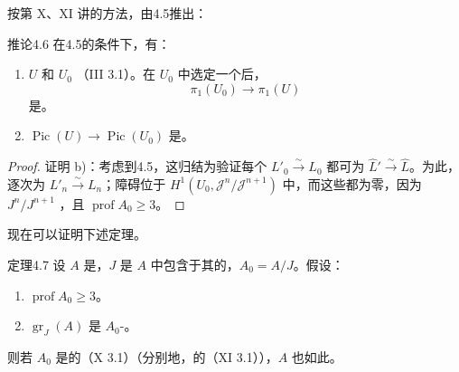 按第 X、XI 讲的方法，由4.5推出：
\begin{SGAresult}{推论}{4.6}
在4.5的条件下，有：
\begin{enumerate}
\item[a)] $U$ 和 $U_0$ （III 3.1）。在 $U_0$ 中选定一个后，
\[
 \pi_1(U_0)\longrightarrow\pi_1(U)
\]
是。
\item[b)]  $\operatorname{Pic}(U)\to\operatorname{Pic}(U_0)$ 是。
\end{enumerate}
\end{SGAresult}
\begin{proof}
证明 b)：考虑到4.5，这归结为验证每个 $L'_0\xrightarrow{\sim}L_0$ 都可为 $\widehat L'\xrightarrow{\sim}\widehat L$。为此，逐次为 $L'_n\xrightarrow{\sim}L_n$；障碍位于
$H^1(U_0,\mathcal J^n/\mathcal J^{n+1})$ 中，而这些都为零，因为 $J^n/J^{n+1}$ ，且 $\operatorname{prof}A_0\geq3$。
\end{proof}
现在可以证明下述定理。
\begin{SGAresult}{定理}{4.7}
设 $A$ 是，$J$ 是 $A$ 中包含于其的，$A_0=A/J$。假设：
\begin{enumerate}
\item[(i)] $\operatorname{prof}A_0\geq3$。
\item[(ii)] $\operatorname{gr}_J(A)$ 是 $A_0$-。
\end{enumerate}
则若 $A_0$ 是的（X 3.1）（分别地，的（XI 3.1）），$A$ 也如此。
\end{SGAresult}
